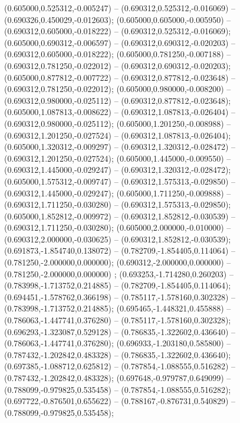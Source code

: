  (0.605000,0.525312,-0.005247) -- (0.690312,0.525312,-0.016069) -- (0.690326,0.450029,-0.012603);
 (0.605000,0.605000,-0.005950) -- (0.690312,0.605000,-0.018222) -- (0.690312,0.525312,-0.016069);
 (0.605000,0.690312,-0.006597) -- (0.690312,0.690312,-0.020203) -- (0.690312,0.605000,-0.018222);
 (0.605000,0.781250,-0.007188) -- (0.690312,0.781250,-0.022012) -- (0.690312,0.690312,-0.020203);
 (0.605000,0.877812,-0.007722) -- (0.690312,0.877812,-0.023648) -- (0.690312,0.781250,-0.022012);
 (0.605000,0.980000,-0.008200) -- (0.690312,0.980000,-0.025112) -- (0.690312,0.877812,-0.023648);
 (0.605000,1.087813,-0.008622) -- (0.690312,1.087813,-0.026404) -- (0.690312,0.980000,-0.025112);
 (0.605000,1.201250,-0.008988) -- (0.690312,1.201250,-0.027524) -- (0.690312,1.087813,-0.026404);
 (0.605000,1.320312,-0.009297) -- (0.690312,1.320312,-0.028472) -- (0.690312,1.201250,-0.027524);
 (0.605000,1.445000,-0.009550) -- (0.690312,1.445000,-0.029247) -- (0.690312,1.320312,-0.028472);
 (0.605000,1.575312,-0.009747) -- (0.690312,1.575313,-0.029850) -- (0.690312,1.445000,-0.029247);
 (0.605000,1.711250,-0.009888) -- (0.690312,1.711250,-0.030280) -- (0.690312,1.575313,-0.029850);
 (0.605000,1.852812,-0.009972) -- (0.690312,1.852812,-0.030539) -- (0.690312,1.711250,-0.030280);
 (0.605000,2.000000,-0.010000) -- (0.690312,2.000000,-0.030625) -- (0.690312,1.852812,-0.030539);
 (0.691873,-1.854740,0.138072) -- (0.782709,-1.854405,0.114064) -- (0.781250,-2.000000,0.000000);
 (0.690312,-2.000000,0.000000) -- (0.781250,-2.000000,0.000000) ;
 (0.693253,-1.714280,0.260203) -- (0.783998,-1.713752,0.214885) -- (0.782709,-1.854405,0.114064);
 (0.694451,-1.578762,0.366198) -- (0.785117,-1.578160,0.302328) -- (0.783998,-1.713752,0.214885);
 (0.695465,-1.448321,0.455888) -- (0.786063,-1.447741,0.376280) -- (0.785117,-1.578160,0.302328);
 (0.696293,-1.323087,0.529128) -- (0.786835,-1.322602,0.436640) -- (0.786063,-1.447741,0.376280);
 (0.696933,-1.203180,0.585800) -- (0.787432,-1.202842,0.483328) -- (0.786835,-1.322602,0.436640);
 (0.697385,-1.088712,0.625812) -- (0.787854,-1.088555,0.516282) -- (0.787432,-1.202842,0.483328);
 (0.697648,-0.979787,0.649099) -- (0.788099,-0.979825,0.535458) -- (0.787854,-1.088555,0.516282);
 (0.697722,-0.876501,0.655622) -- (0.788167,-0.876731,0.540829) -- (0.788099,-0.979825,0.535458);
